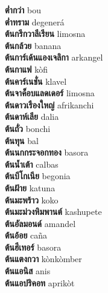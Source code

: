 \textbf{ ต่ำกว่า  } bou \\
\textbf{ ต่ำทราม  } degenerá \\
\textbf{ ต้นกรีกวาลีเรียน  } limosna \\
\textbf{ ต้นกล้วย  } banana \\
\textbf{ ต้นการ์เด้นแองเจลิกา  } arkangel \\
\textbf{ ต้นกาแฟ  } kòfi \\
\textbf{ ต้นคาร์เนชั่น  } klavel \\
\textbf{ ต้นจาค็อบแลดเดอร์  } limosna \\
\textbf{ ต้นดาวเรืองใหญ่  } afrikanchi \\
\textbf{ ต้นดาห์เลีย  } dalia \\
\textbf{ ต้นถั่ว  } bonchi \\
\textbf{ ต้นทุน  } bal \\
\textbf{ ต้นนกกระจอกทอง  } basora \\
\textbf{ ต้นน้ำเต้า  } calbas \\
\textbf{ ต้นบีโกเนีย  } begonia \\
\textbf{ ต้นฝ้าย  } katuna \\
\textbf{ ต้นมะพร้าว  } koko \\
\textbf{ ต้นมะม่วงหิมพานต์  } kashupete \\
\textbf{ ต้นอัลมอนด์  } amandel \\
\textbf{ ต้นอ้อย  } caña \\
\textbf{ ต้นฮีเทอร์  } basora \\
\textbf{ ต้นแตงกวา  } kònkòmber \\
\textbf{ ต้นแอนิส  } anis \\
\textbf{ ต้นแอปริคอท  } aprikòt \\
